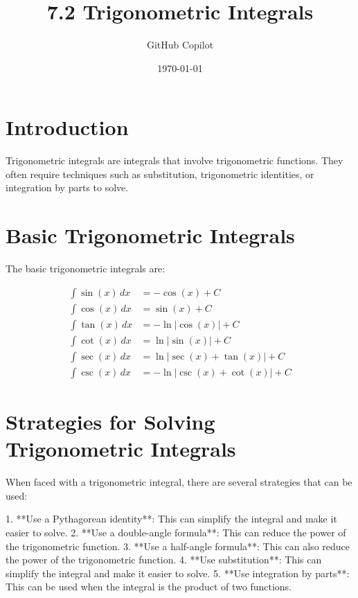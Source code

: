 \documentclass{article}
\begin{document}
\title{7.2 Trigonometric Integrals}
\author{GitHub Copilot}
\date{\today}

\maketitle

\section{Introduction}

Trigonometric integrals are integrals that involve trigonometric functions. They often require techniques such as substitution, trigonometric identities, or integration by parts to solve.

\section{Basic Trigonometric Integrals}

The basic trigonometric integrals are:

\begin{align*}
    \int \sin(x) \, dx &= -\cos(x) + C \\
    \int \cos(x) \, dx &= \sin(x) + C \\
    \int \tan(x) \, dx &= -\ln|\cos(x)| + C \\
    \int \cot(x) \, dx &= \ln|\sin(x)| + C \\
    \int \sec(x) \, dx &= \ln|\sec(x) + \tan(x)| + C \\
    \int \csc(x) \, dx &= -\ln|\csc(x) + \cot(x)| + C
\end{align*}

\section{Strategies for Solving Trigonometric Integrals}

When faced with a trigonometric integral, there are several strategies that can be used:

1. **Use a Pythagorean identity**: This can simplify the integral and make it easier to solve.
2. **Use a double-angle formula**: This can reduce the power of the trigonometric function.
3. **Use a half-angle formula**: This can also reduce the power of the trigonometric function.
4. **Use substitution**: This can simplify the integral and make it easier to solve.
5. **Use integration by parts**: This can be used when the integral is the product of two functions.
\end{document}
